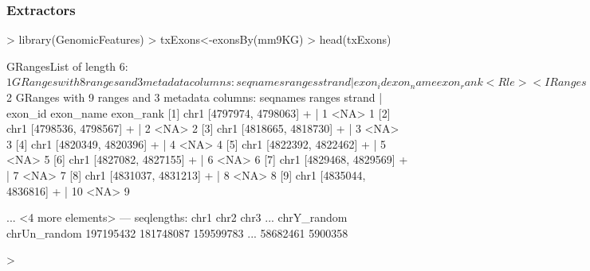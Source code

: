 \documentclass{beamer}
\begin{document}
\begin{frame}[fragile]
\frametitle{Extractors}
     \begin{uncoverenv}
\begin{Schunk}
\begin{Sinput}
> library(GenomicFeatures)
> txExons<-exonsBy(mm9KG)
> head(txExons)
\end{Sinput}
\begin{Soutput}
GRangesList of length 6:
$1 
GRanges with 8 ranges and 3 metadata columns:
      seqnames             ranges strand |   exon_id   exon_name exon_rank
         <Rle>          <IRanges>  <Rle> | <integer> <character> <integer>
  [1]     chr1 [4797974, 4798063]      + |         1        <NA>         1
  [2]     chr1 [4798536, 4798567]      + |         2        <NA>         2
  [3]     chr1 [4818665, 4818730]      + |         3        <NA>         3
  [4]     chr1 [4820349, 4820396]      + |         4        <NA>         4
  [5]     chr1 [4822392, 4822462]      + |         5        <NA>         5
  [6]     chr1 [4827082, 4827155]      + |         6        <NA>         6
  [7]     chr1 [4829468, 4829569]      + |         7        <NA>         7
  [8]     chr1 [4831037, 4832908]      + |         9        <NA>         8

$2 
GRanges with 9 ranges and 3 metadata columns:
      seqnames             ranges strand | exon_id exon_name exon_rank
  [1]     chr1 [4797974, 4798063]      + |       1      <NA>         1
  [2]     chr1 [4798536, 4798567]      + |       2      <NA>         2
  [3]     chr1 [4818665, 4818730]      + |       3      <NA>         3
  [4]     chr1 [4820349, 4820396]      + |       4      <NA>         4
  [5]     chr1 [4822392, 4822462]      + |       5      <NA>         5
  [6]     chr1 [4827082, 4827155]      + |       6      <NA>         6
  [7]     chr1 [4829468, 4829569]      + |       7      <NA>         7
  [8]     chr1 [4831037, 4831213]      + |       8      <NA>         8
  [9]     chr1 [4835044, 4836816]      + |      10      <NA>         9

...
<4 more elements>
---
seqlengths:
         chr1         chr2         chr3 ...  chrY_random chrUn_random
    197195432    181748087    159599783 ...     58682461      5900358
\end{Soutput}
\begin{Sinput}
> 
\end{Sinput}
\end{Schunk}
      \end{uncoverenv}   
\end{frame}
  
\end{document}
